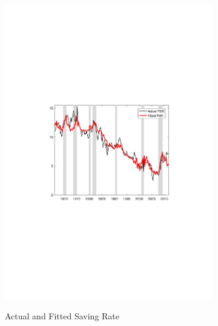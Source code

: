 \documentclass[titlepage]{\econtex}
\begin{document}
\begin{figure}	\caption{The Structural Estimation: Main Results} 
	\centering
	\begin{subfigure}[t]{0.49\textheight}
		\centering
    \addtocounter{figure}{-1}
		{\includegraphics[width=0.475\textheight]{./Figures/fPSR_StructFit}}
		\caption{Actual and Fitted Saving Rate}		\label{fPSR_StructFit}
	\end{subfigure}
	\begin{subfigure}[t]{0.49\textheight}
		\centering

\end{subfigure}
\end{figure}
\end{document}

